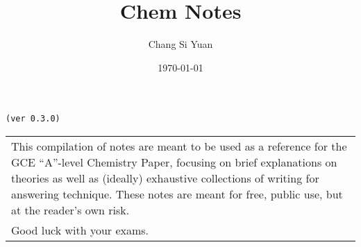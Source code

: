 \documentclass[../main]{subfiles}
\begin{document}
\author{Chang Si Yuan}
\title{Chem Notes}
\date{\today}

\maketitle

\begin{center}

	\texttt{(ver 0.3.0)}

	\vspace{50pt}

	\begin{tabular}{>{\flushleft}p{8cm}}
	This compilation of notes are meant to be used as a reference for the GCE ``A''-level Chemistry Paper, focusing on brief explanations on theories as well as (ideally) exhaustive collections of writing for answering technique. These notes are meant for free, public use, but at the reader's own risk. \\
	Good luck with your exams.
	\end{tabular}

\end{center}

\newpage
\end{document}
